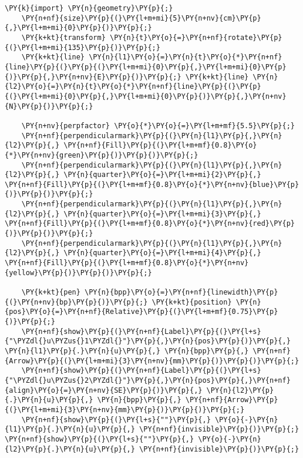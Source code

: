 \begin{Verbatim}[commandchars=\\\{\}]
    \PY{k}{import} \PY{n}{geometry}\PY{p}{;}
    \PY{n+nf}{size}\PY{p}{(}\PY{l+m+mi}{5}\PY{n+nv}{cm}\PY{p}{,}\PY{l+m+mi}{0}\PY{p}{)}\PY{p}{;}
    \PY{k+kt}{transform} \PY{n}{t}\PY{o}{=}\PY{n+nf}{rotate}\PY{p}{(}\PY{l+m+mi}{135}\PY{p}{)}\PY{p}{;}
    \PY{k+kt}{line} \PY{n}{l1}\PY{o}{=}\PY{n}{t}\PY{o}{*}\PY{n+nf}{line}\PY{p}{(}\PY{p}{(}\PY{l+m+mi}{0}\PY{p}{,}\PY{l+m+mi}{0}\PY{p}{)}\PY{p}{,}\PY{n+nv}{E}\PY{p}{)}\PY{p}{;} \PY{k+kt}{line} \PY{n}{l2}\PY{o}{=}\PY{n}{t}\PY{o}{*}\PY{n+nf}{line}\PY{p}{(}\PY{p}{(}\PY{l+m+mi}{0}\PY{p}{,}\PY{l+m+mi}{0}\PY{p}{)}\PY{p}{,}\PY{n+nv}{N}\PY{p}{)}\PY{p}{;}

    \PY{n+nv}{perpfactor} \PY{o}{*}\PY{o}{=}\PY{l+m+mf}{5.5}\PY{p}{;}
    \PY{n+nf}{perpendicularmark}\PY{p}{(}\PY{n}{l1}\PY{p}{,}\PY{n}{l2}\PY{p}{,} \PY{n+nf}{Fill}\PY{p}{(}\PY{l+m+mf}{0.8}\PY{o}{*}\PY{n+nv}{green}\PY{p}{)}\PY{p}{)}\PY{p}{;}
    \PY{n+nf}{perpendicularmark}\PY{p}{(}\PY{n}{l1}\PY{p}{,}\PY{n}{l2}\PY{p}{,} \PY{n}{quarter}\PY{o}{=}\PY{l+m+mi}{2}\PY{p}{,} \PY{n+nf}{Fill}\PY{p}{(}\PY{l+m+mf}{0.8}\PY{o}{*}\PY{n+nv}{blue}\PY{p}{)}\PY{p}{)}\PY{p}{;}
    \PY{n+nf}{perpendicularmark}\PY{p}{(}\PY{n}{l1}\PY{p}{,}\PY{n}{l2}\PY{p}{,} \PY{n}{quarter}\PY{o}{=}\PY{l+m+mi}{3}\PY{p}{,} \PY{n+nf}{Fill}\PY{p}{(}\PY{l+m+mf}{0.8}\PY{o}{*}\PY{n+nv}{red}\PY{p}{)}\PY{p}{)}\PY{p}{;}
    \PY{n+nf}{perpendicularmark}\PY{p}{(}\PY{n}{l1}\PY{p}{,}\PY{n}{l2}\PY{p}{,} \PY{n}{quarter}\PY{o}{=}\PY{l+m+mi}{4}\PY{p}{,} \PY{n+nf}{Fill}\PY{p}{(}\PY{l+m+mf}{0.8}\PY{o}{*}\PY{n+nv}{yellow}\PY{p}{)}\PY{p}{)}\PY{p}{;}

    \PY{k+kt}{pen} \PY{n}{bpp}\PY{o}{=}\PY{n+nf}{linewidth}\PY{p}{(}\PY{n+nv}{bp}\PY{p}{)}\PY{p}{;} \PY{k+kt}{position} \PY{n}{pos}\PY{o}{=}\PY{n+nf}{Relative}\PY{p}{(}\PY{l+m+mf}{0.75}\PY{p}{)}\PY{p}{;}
    \PY{n+nf}{show}\PY{p}{(}\PY{n+nf}{Label}\PY{p}{(}\PY{l+s}{"\PYZdl{}u\PYZus{}1\PYZdl{}"}\PY{p}{,}\PY{n}{pos}\PY{p}{)}\PY{p}{,} \PY{n}{l1}\PY{p}{.}\PY{n}{u}\PY{p}{,} \PY{n}{bpp}\PY{p}{,} \PY{n+nf}{Arrow}\PY{p}{(}\PY{l+m+mi}{3}\PY{n+nv}{mm}\PY{p}{)}\PY{p}{)}\PY{p}{;}
    \PY{n+nf}{show}\PY{p}{(}\PY{n+nf}{Label}\PY{p}{(}\PY{l+s}{"\PYZdl{}u\PYZus{}2\PYZdl{}"}\PY{p}{,}\PY{n}{pos}\PY{p}{,}\PY{n+nf}{align}\PY{o}{=}\PY{n+nv}{SE}\PY{p}{)}\PY{p}{,} \PY{n}{l2}\PY{p}{.}\PY{n}{u}\PY{p}{,} \PY{n}{bpp}\PY{p}{,} \PY{n+nf}{Arrow}\PY{p}{(}\PY{l+m+mi}{3}\PY{n+nv}{mm}\PY{p}{)}\PY{p}{)}\PY{p}{;}
    \PY{n+nf}{show}\PY{p}{(}\PY{l+s}{""}\PY{p}{,} \PY{o}{-}\PY{n}{l1}\PY{p}{.}\PY{n}{u}\PY{p}{,} \PY{n+nf}{invisible}\PY{p}{)}\PY{p}{;} \PY{n+nf}{show}\PY{p}{(}\PY{l+s}{""}\PY{p}{,} \PY{o}{-}\PY{n}{l2}\PY{p}{.}\PY{n}{u}\PY{p}{,} \PY{n+nf}{invisible}\PY{p}{)}\PY{p}{;}
\end{Verbatim}
